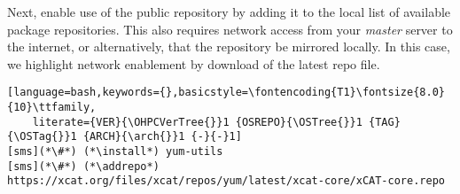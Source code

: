 Next, enable use of the public \xCAT{} repository by adding it to the local list
of available package repositories. This also requires network access from
your {\em master} server to the internet, or alternatively, that
the repository be mirrored locally. In this case, we highlight network
enablement by download of the
latest \xCAT{} repo file.

\begin{lstlisting}[language=bash,keywords={},basicstyle=\fontencoding{T1}\fontsize{8.0}{10}\ttfamily,
	literate={VER}{\OHPCVerTree{}}1 {OSREPO}{\OSTree{}}1 {TAG}{\OSTag{}}1 {ARCH}{\arch{}}1 {-}{-}1]
[sms](*\#*) (*\install*) yum-utils
[sms](*\#*) (*\addrepo*) https://xcat.org/files/xcat/repos/yum/latest/xcat-core/xCAT-core.repo
\end{lstlisting}

